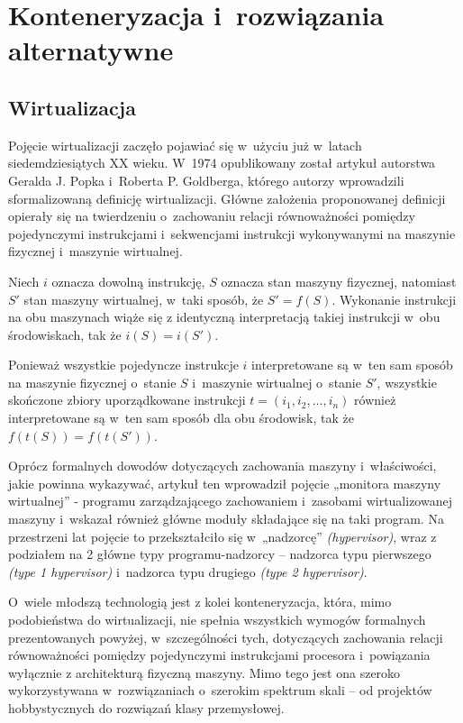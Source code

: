
\section{Konteneryzacja i~rozwiązania alternatywne}
\subsection{Wirtualizacja}
Pojęcie wirtualizacji zaczęło pojawiać się w~użyciu już w~latach siedemdziesiątych XX wieku. W~1974 opublikowany został artykuł autorstwa Geralda J. Popka i~Roberta P. Goldberga, którego autorzy wprowadzili sformalizowaną definicję wirtualizacji. Główne założenia proponowanej definicji opierały się na twierdzeniu o~zachowaniu relacji równoważności pomiędzy pojedynczymi instrukcjami i~sekwencjami instrukcji wykonywanymi na maszynie fizycznej i~maszynie wirtualnej\cite{virtualization}.

\begin{lemat}
	Niech $i$ oznacza dowolną instrukcję, $S$ oznacza stan maszyny fizycznej, natomiast $S'$ stan maszyny wirtualnej, w~taki sposób, że $S' = f(S)$. Wykonanie instrukcji na obu maszynach wiąże się z identyczną interpretacją takiej instrukcji w~obu środowiskach, tak że $i(S) = i(S')$.
\end{lemat}

\begin{lemat}
	Ponieważ wszystkie pojedyncze instrukcje $i$ interpretowane są w~ten sam sposób na maszynie fizycznej o~stanie $S$ i~maszynie wirtualnej o~stanie $S'$, wszystkie skończone zbiory uporządkowane instrukcji $t = (i_1, i_2, \ldots, i_n)$ również interpretowane są w~ten sam sposób dla obu środowisk, tak że $f(t(S)) = f(t(S'))$.
\end{lemat}

\noindent Oprócz formalnych dowodów dotyczących zachowania maszyny i~właściwości, jakie powinna wykazywać, artykuł ten wprowadził pojęcie „monitora maszyny wirtualnej” - programu zarządzającego zachowaniem i~zasobami wirtualizowanej maszyny i~wskazał również główne moduły składające się na taki program. Na przestrzeni lat pojęcie to przekształciło się w~„nadzorcę” \textit{(hypervisor)}, wraz z podziałem na 2 główne typy programu-nadzorcy -- nadzorca typu pierwszego \textit{(type 1 hypervisor)} i~nadzorca typu drugiego \textit{(type 2 hypervisor)}.

\noindent O~wiele młodszą technologią jest z kolei konteneryzacja, która, mimo podobieństwa do wirtualizacji, nie spełnia wszystkich wymogów formalnych prezentowanych powyżej, w~szczególności tych, dotyczących zachowania relacji równoważności pomiędzy pojedynczymi instrukcjami procesora i~powiązania wyłącznie z architekturą fizyczną maszyny. Mimo tego jest ona szeroko wykorzystywana w~rozwiązaniach o~szerokim spektrum skali -- od projektów hobbystycznych do rozwiązań klasy przemysłowej.

